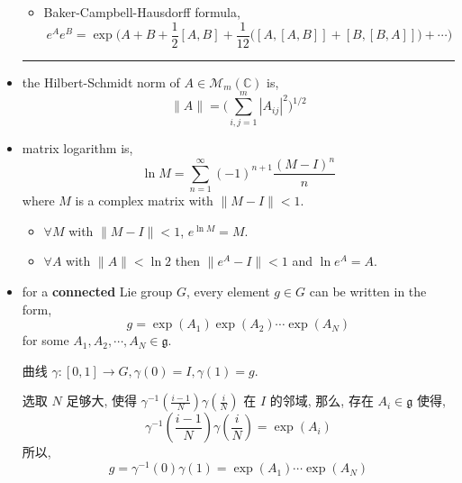 \begin{itemize}
\begin{itemize}
		\item Baker-Campbell-Hausdorff formula,
		\begin{equation}
			e^A e^B = \exp \Big( A + B + \frac{1}{2} [A, B] + \frac{1}{12} \Big( [A, [A, B]] + [B, [B, A]] \Big) + \cdots \Big)
		\end{equation}
	\end{itemize}
	
	\noindent\rule[0.5ex]{\linewidth}{0.5pt} %
	
	\item the Hilbert-Schmidt norm of $A \in \mathcal{M}_m(\mathbb{C})$ is,
	\begin{equation}
		\|A\| = \Big( \sum_{i, j = 1}^m |A_{i j}|^2 \Big)^{1 / 2}
	\end{equation}
	
	\item matrix logarithm is,
	\begin{equation}
		\ln M = \sum_{n = 1}^\infty (- 1)^{n + 1} \frac{(M - I)^n}{n}
	\end{equation}
	where $M$ is a complex matrix with $\|M - I\| < 1$.
	
	\begin{itemize}
		\item $\forall M$ with $\|M - I\| < 1$, $e^{\ln M} = M$.
		
		\item $\forall A$ with $\|A\| < \ln 2$ then $\|e^A - I\| < 1$ and $\ln e^A = A$.
	\end{itemize}
	
	\item for a \textbf{connected} Lie group $G$, every element $g \in G$ can be written in the form,
	\begin{equation} \label{4.2.8}
		g = \exp(A_1) \exp(A_2) \cdots \exp(A_N)
	\end{equation}
	for some $A_1, A_2, \cdots, A_N \in \mathfrak{g}$.
	
	\begin{tcolorbox}[title=proof:]
		曲线 $\gamma : [0, 1] \rightarrow G, \gamma(0) = I, \gamma(1) = g$.
		
		选取 $N$ 足够大, 使得 $\gamma^{- 1}(\frac{i - 1}{N}) \gamma(\frac{i}{N})$ 在 $I$ 的邻域, 那么, 存在 $A_i \in \mathfrak{g}$ 使得,
		\begin{equation}
			\gamma^{- 1}(\frac{i - 1}{N}) \gamma(\frac{i}{N}) = \exp(A_i)
		\end{equation}
		所以,
		\begin{equation}
			g = \gamma^{- 1}(0) \gamma(1) = \exp(A_1) \cdots \exp(A_N)
		\end{equation}
	\end{tcolorbox}
	

\end{itemize}
